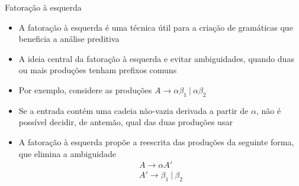 \begin{frame}[fragile]{Fatoração à esquerda}

    \begin{itemize}
        \item A fatoração à esquerda é uma técnica útil para a criação de gramáticas que beneficia a análise preditiva
        \pause

        \item A ideia central da fatoração à esquerda e evitar ambiguidades, quando duas ou mais produções tenham prefixos comuns
        \pause

        \item Por exemplo, considere as produções $A \to \alpha \beta_1\ |\ \alpha \beta_2$
        \pause

        \item Se a entrada contém uma cadeia não-vazia derivada a partir de $\alpha$, não é possível decidir, de antemão, qual das duas produções usar
        \pause

        \item A fatoração à esquerda propõe a reescrita das produções da seguinte forma, que elimina a ambiguidade
        \[
            \begin{array}{l}
                A \to \alpha A' \\
                A' \to \beta_1\ |\ \beta_2
            \end{array}
        \]
    \end{itemize}

\end{frame}

